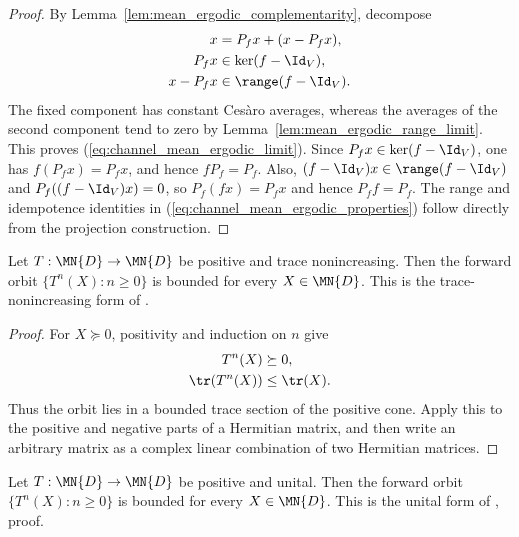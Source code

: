 \begin{proof}\leanok
    By Lemma~\ref{lem:mean_ergodic_complementarity}, decompose
    \begin{align}
        x      & =P_fx+(x-P_fx), \notag   \\
        P_fx   & \in\ker(f-\Id_V), \notag \\
        x-P_fx & \in\range(f-\Id_V).
    \end{align}
    The fixed component has constant Ces\`aro averages, whereas the averages
    of the second component tend to zero by
    Lemma~\ref{lem:mean_ergodic_range_limit}. This proves
    (\ref{eq:channel_mean_ergodic_limit}). Since
    $P_fx\in\ker(f-\Id_V)$, one has $f(P_fx)=P_fx$, and hence
    $fP_f=P_f$. Also, $(f-\Id_V)x\in\range(f-\Id_V)$ and
    $P_f((f-\Id_V)x)=0$, so $P_f(fx)=P_fx$ and hence $P_ff=P_f$.
    The range and idempotence identities in
    (\ref{eq:channel_mean_ergodic_properties}) follow directly from the
    projection construction.
\end{proof}

\begin{theorem}
    \label{thm:positive_trace_nonincreasing_bounded_orbits}
    \leanok
    Let $T:\MN{D}\to\MN{D}$ be positive and trace nonincreasing. Then the
    forward orbit $\{T^n(X):n\geq0\}$ is bounded for every $X\in\MN{D}$.
    This is the trace-nonincreasing form of
    \cite[Proposition~6.3]{Wolf2012Quantum}.
\end{theorem}

\begin{proof}\leanok
    For $X\succeq0$, positivity and induction on $n$ give
    \begin{align}
        T^n(X)      & \succeq0, \notag \\
        \tr(T^n(X)) & \leq\tr(X).
    \end{align}
    Thus the orbit lies in a bounded trace section of the positive cone.
    Apply this to the positive and negative parts of a Hermitian matrix, and
    then write an arbitrary matrix as a complex linear combination of two
    Hermitian matrices.
\end{proof}

\begin{theorem}
    \label{thm:positive_unital_bounded_orbits}
    \leanok
    Let $T:\MN{D}\to\MN{D}$ be positive and unital. Then the forward orbit
    $\{T^n(X):n\geq0\}$ is bounded for every $X\in\MN{D}$. This is the
    unital form of \cite[Proposition~6.2]{Wolf2012Quantum}, proof.
\end{theorem}

